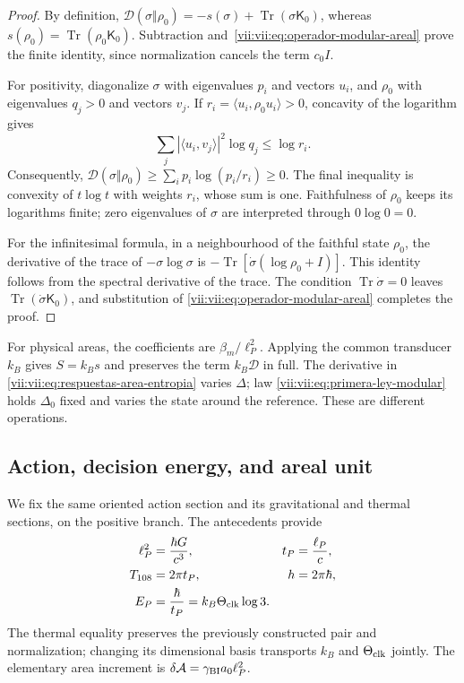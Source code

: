\begin{proof}
By definition,
\(\mathcal D(\sigma\Vert\rho_0)=-s(\sigma)
+\operatorname{Tr}(\sigma\mathsf K_0)\), whereas
\(s(\rho_0)=\operatorname{Tr}(\rho_0\mathsf K_0)\).
Subtraction and~\eqref{vii:vii:eq:operador-modular-areal} prove the finite
identity, since normalization cancels the term \(c_0I\).

For positivity, diagonalize \(\sigma\) with eigenvalues
\(p_i\) and vectors \(u_i\), and \(\rho_0\) with eigenvalues
\(q_j>0\) and vectors \(v_j\). If
\(r_i=\langle u_i,\rho_0u_i\rangle>0\), concavity of the
logarithm gives
\[
 \sum_j|\langle u_i,v_j\rangle|^2\log q_j\le\log r_i.
\]
Consequently,
\(\mathcal D(\sigma\Vert\rho_0)
\ge\sum_i p_i\log(p_i/r_i)\ge0\).
The final inequality is convexity of \(t\log t\) with weights
\(r_i\), whose sum is one. Faithfulness of \(\rho_0\) keeps its
logarithms finite; zero eigenvalues of \(\sigma\) are
interpreted through \(0\log0=0\).

For the infinitesimal formula, in a neighbourhood of the faithful state \(\rho_0\),
the derivative of the trace of \(-\sigma\log\sigma\) is
\(-\operatorname{Tr}[\dot\sigma(\log\rho_0+I)]\).
This identity follows from the spectral derivative of the trace.
The condition \(\operatorname{Tr}\dot\sigma=0\) leaves
\(\operatorname{Tr}(\dot\sigma\mathsf K_0)\), and substitution of
\eqref{vii:vii:eq:operador-modular-areal} completes the proof.
\end{proof}

For physical areas, the coefficients are \(\beta_m/\ell_P^2\).
Applying the common transducer \(k_B\) gives \(S=k_Bs\) and
preserves the term \(k_B\mathcal D\) in full. The derivative in
\eqref{vii:vii:eq:respuestas-area-entropia} varies \(\Delta\); law
\eqref{vii:vii:eq:primera-ley-modular} holds \(\Delta_0\) fixed and
varies the state around the reference. These are different operations.

\subsection{Action, decision energy, and areal unit}
\label{vii:vii:subsec:conversion-informacion-area}

We fix the same oriented action section and its gravitational
and thermal sections, on the positive branch. The antecedents provide
\begin{equation}
 \begin{aligned}
 \ell_P^2&=\frac{\hbar G}{c^3},& t_P&=\frac{\ell_P}{c},\\
 T_{108}&=2\pi t_P,& h&=2\pi\hbar,\\
 E_P&=\frac{\hbar}{t_P}=k_B\Theta_{\rm clk}\log3.&&
 \end{aligned}
 \label{vii:vii:eq:unidad-accion-informacion}
\end{equation}
The thermal equality preserves the previously constructed pair and
normalization; changing its dimensional basis transports
\(k_B\) and \(\Theta_{\rm clk}\) jointly. The elementary area increment is
\(\delta\mathcal A=\gamma_{\rm BI}a_0\ell_P^2\).

